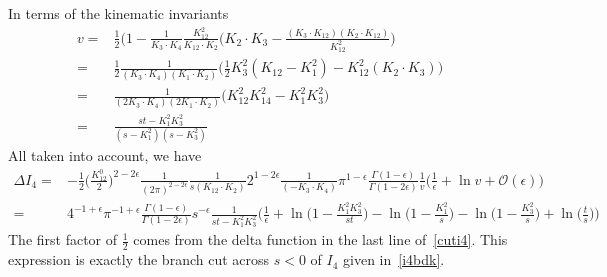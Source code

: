 In terms of the kinematic invariants
\begin{equation*}
\begin{split}
v= &
\frac{1}{2}\Big( 1 - \frac{1}{K_3\cdot K_4}\frac{K_{12}^2}{K_{12}\cdot K_2}\big(K_2\cdot K_3 - \frac{(K_3\cdot K_{12})(K_2\cdot K_{12})}{K_{12}^2} \Big)
\\
= &
\frac{1}{2}\frac{1}{(K_3\cdot K_4)(K_1\cdot K_2)}
\Big( \frac{1}{2}K_3^2 (K_{12}- K_1^2) - K_{12}^2(K_2\cdot K_3)
\Big)
\\
=&
\frac{1}{(2K_3\cdot K_4)(2K_1\cdot K_2)}\big(K_{12}^2K_{14}^2 - K_1^2K_3^2\big)
\\
= &
\frac{st - K_1^2K_3^2}{(s-K_1^2)(s-K_3^2)}
\end{split}
\end{equation*}
%
All taken into account, we have
\begin{equation*}
\begin{split}
\Delta I_4 = & -\frac{1}{2}\big(\frac{K_{12}^0}{2}\big)^{2-2\epsilon}\frac{1}{(2\pi)^{2-2\epsilon}}\frac{1}{s (K_{12}\cdot K_2)}2^{1-2\epsilon}\frac{1}{(-K_3\cdot K_4)}\pi^{1-\epsilon} \frac{\Gamma(1-\epsilon)}{\Gamma(1-2\epsilon)}
\frac{1}{v}\Big(\frac{1}{\epsilon} + \ln v + \mathcal{O}(\epsilon)\Big)
\\
= & 4^{-1+\epsilon}\pi^{-1+\epsilon}\frac{\Gamma(1-\epsilon)}{\Gamma(1-2\epsilon)}s^{-\epsilon}\frac{1}{st - K_1^2K_3^2}\Big(
\frac{1}{\epsilon} + \ln\big(1-\frac{K_1^2K_3^2}{st}\big)
-\ln\big(1-\frac{K_1^2}{s}\big) - \ln\big(1-\frac{K_3^2}{s}\big) + \ln\big(\frac{t}{s}\big)\Big)
\end{split}
\end{equation*}
The first factor of $\frac{1}{2}$ comes from the delta function in the last line of~\cref{cuti4}.
This expression is exactly the branch cut across $s < 0 $ of $I_4$ given in~\cref{i4bdk}. \\\\
